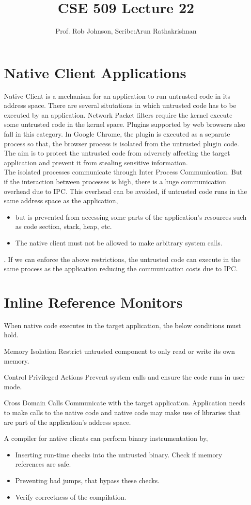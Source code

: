 \documentclass[11pt]{article} %
\title{CSE 509 Lecture 22}
\author{Prof. Rob Johnson, Scribe:Arun Rathakrishnan}
\begin{document}
\maketitle
\section {Native Client Applications}
Native Client is a mechanism for  an application to run untrusted code in its
address space. There are several situtations in which untrusted code has to be
executed by an application. Network Packet filters require the kernel execute
some untrusted code in the kernel space. Plugins supported by web browsers also
fall in this category. In Google Chrome, the plugin is executed as a separate
process so that, the browser process is isolated from the untrusted plugin code.
The aim is to protect the untrusted code from adversely affecting the target
application and prevent it from stealing sensitive information.\\

The isolated processes communicate through Inter Process Communication. But if the
interaction between processes is high, there is a huge communication overhead
due to IPC. This overhead can be avoided, if untrusted code runs in the same
address space as the application,
\begin {itemize} \itemsep -2pt
\item but is prevented from accessing some parts of the application's resources
such as code section, stack, heap, etc.
\item The native client must not be allowed to make arbitrary system calls.
\end {itemize}.
If we can enforce the above restrictions, the untrusted code can execute in the 
same process as the application reducing the communication costs due to IPC.
\section {Inline Reference Monitors}
When native code executes in the target application, the below conditions must
hold.
\begin {description} \itemsep -2pt
\item [Memory Isolation] Restrict untrusted component to only
read or write its own memory.
\item [Control Privileged Actions] Prevent system calls and
ensure the code runs in user mode.
\item [Cross Domain Calls] Communicate with the target application.
Application needs to make calls to the native code and native code may make use
of libraries that are part of the application's address space.
\end {description}
A compiler for native clients can perform binary instrumentation by,
\begin {itemize} \itemsep -2pt
\item Inserting run-time checks into the untrusted binary. Check if memory
references are safe.
\item Preventing bad jumps, that bypass these checks.
\item Verify correctness of the compilation.
\end {itemize}
\end{document}
